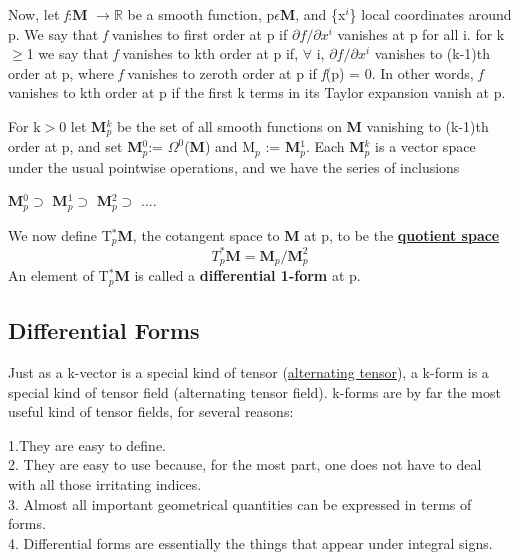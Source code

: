 Now, let \textit{f}:\textbf{M} $\rightarrow \mathbb{R}$ be a smooth function, p$\epsilon$\textbf{M}, and \{x$^i$\} local coordinates around
p. We say that \textit{f} vanishes to first order at p if $\partial f /\partial x^i$ vanishes at p for all i.
for k$\geq$1 we say that \textit{f} vanishes to kth order at p if, $\forall$ i, $\partial f /\partial x^i$ vanishes to (k-1)th order at p,
where \textit{f} vanishes to zeroth order at p if \textit{f}(p) = 0. 
In other words, \textit{f} vanishes to kth order at p if the first k terms in its Taylor expansion vanish at p.

For k$>$0 let \textbf{M}$^k_p$ be the set of all smooth functions on \textbf{M} vanishing to (k-1)th order at p, 
and set \textbf{M}$^0_p$:= $\Omega^0$(\textbf{M}) and M$_p$ := \textbf{M}$^1_p$. Each \textbf{M}$^k_p$ is a vector
space under the usual pointwise operations, and we have the series of inclusions
\begin{center}
    \textbf{M}$^0_p \supset$ \textbf{M}$^1_p \supset$ \textbf{M}$^2_p \supset$ ....    
\end{center}

We now define T$_p^*$\textbf{M}, the cotangent space to \textbf{M} at p, to be the
\href{https://www.youtube.com/watch?v=nh-YgZph-r4}{\textbf{quotient space}} 
\begin{equation}
    T_p^*\textbf{M} = \textbf{M}_p/\textbf{M}^2_p
\end{equation}
An element of T$_p^*$\textbf{M} is called a \textbf{differential 1-form} at p.

\subsection{Differential Forms}
Just as a k-vector is a special kind of tensor (\href{https://web2.clarkson.edu/projects/subramanian/ch490/notes/Alternating%20Unit%20Tensor.pdf}{alternating tensor}), a k-form is a
special kind of tensor field (alternating tensor field).  
k-forms are by far the most useful kind of tensor fields, for several reasons:

1.They are easy to define. \\
2. They are easy to use because, for the most part, one does not have to deal with all those irritating indices. \\
3. Almost all important geometrical quantities can be expressed in terms of forms. \\
4. Differential forms are essentially the things that appear under integral signs.

